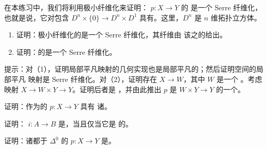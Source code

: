 \begin{exercise}\label{ex:realization-serre-fibration}
在本练习中，我们将利用极小纤维化来证明：\trKanFibration{} $p\colon X \to Y$ 的%
\trGeometricRealization{}是一个 Serre 纤维化，也就是说，它对包含
$D^n \times \{0\} \to D^n \times D^1$ 具有\trRightLiftingProperty{}。这里，$D^n$
是 $n$ 维拓扑立方体。
\begin{enumerate}[label=(\arabic*)]
  \item 证明：极小纤维化的\trGeometricRealization{}是一个 Serre 纤维化，其纤维由
        该\trKanFibration{}之\trFibre{}的\trGeometricRealization{}给出。
  \item 证明：\trTrivialFibration{}的\trGeometricRealization{}是一个 Serre 纤维化。
\end{enumerate}
提示：对（1），证明局部平凡映射的几何实现也是局部平凡的；然后证明空间的局部平凡
映射是 Serre 纤维化。对（2），证明存在\trMonomorphism{} $X \to W$，其中 $W$ 是一个%
\trContractible{} \trKanComplex{}。考虑映射 $X \to W \times Y \to Y$。证明后者是%
\trTrivialFibration{}，并由此推出 $p$ 是 $W \times Y \to Y$ 的一个\trRetract{}。
\end{exercise}

\begin{exercise}\label{ex:kan-fibration-weak-equivalence-fibres}
证明：作为\trWeakEquivalence{}的\trKanFibration{} $p\colon X \to Y$ 具有%
\trContractible{}诸\trFibre{}。
\end{exercise}

\begin{exercise}\label{ex:mono-weak-equivalence-anodyne}
证明：\trMonomorphism{} $i\colon A \to B$ 是\trWeakEquivalence{}，当且仅当它是%
\trAnodyne{}的。
\end{exercise}

\begin{exercise}\label{ex:cocartesian-trivial-fibration}
证明：诸\trFibre{}都\trJoyalEquivalence{}于 $\Delta^0$ 的\trCocartesianFibration{}%
$p\colon X \to Y$ 是\trTrivialFibration{}。
\end{exercise}

